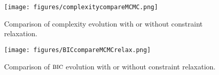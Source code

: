 \documentclass[12pt,a4paper]{report}
\begin{document}
\begin{center}
	\begin{figure}[h!]
	\centering
\texttt{[image: figures/complexitycompareMCMC.png]} 		
\caption{Comparison of complexity evolution with or without constraint relaxation.}\label{comparecomplrelax}
	\end{figure}
	\end{center}
			
\begin{center}
	\begin{figure}[h!]
	\centering
\texttt{[image: figures/BICcompareMCMCrelax.png]} 		
\caption{Comparison of $\mbox{{\sc bic}}$ evolution with or without constraint relaxation.}\label{compareBICrelax}
	\end{figure}
	\end{center}
	
\FloatBarrier
\end{document}
